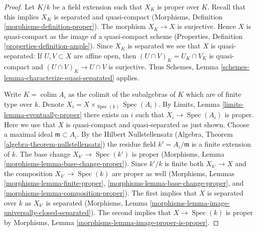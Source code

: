 \documentclass[10pt,a4paper]{amsart}
\theoremstyle{plain}
\theoremstyle{definition}
\theoremstyle{remark}
\numberwithin{equation}{subsection}
\def\colim{\mathop{\mathrm{colim}}\nolimits}
\def\Spec{\mathop{\mathrm{Spec}}}
\begin{document}
\begin{proof}
Let $K/k$ be a field extension such that $X_K$ is proper over $K$.
Recall that this implies $X_K$ is separated and quasi-compact
(Morphisms, Definition \ref{morphisms-definition-proper}).
The morphism $X_K \to X$ is surjective. Hence $X$ is quasi-compact
as the image of a quasi-compact scheme (Properties, Definition
\ref{properties-definition-ample}). Since $X_K$ is separated
we see that $X$ is quasi-separated: If $U, V \subset X$ are
affine open, then $(U \cap V)_K = U_K \cap V_K$ is quasi-compact
and $(U \cap V)_K \to U \cap V$ is surjective. Thus
Schemes, Lemma \ref{schemes-lemma-characterize-quasi-separated} applies.

\medskip\noindent
Write $K = \colim A_i$ as the colimit of the subalgebras of $K$
which are of finite type over $k$. Denote
$X_i = X \times_{\Spec(k)} \Spec(A_i)$.
By Limits, Lemma \ref{limits-lemma-eventually-proper}
there exists an $i$ such that $X_i \to \Spec(A_i)$ is proper.
Here we use that $X$ is quasi-compact and quasi-separated as
just shown. Choose a maximal ideal $\mathfrak m \subset A_i$.
By the Hilbert Nullstellensatz
(Algebra, Theorem \ref{algebra-theorem-nullstellensatz})
the residue field $k' = A_i/\mathfrak m$ is a finite
extension of $k$.  The base change $X_{k'} \to \Spec(k')$
is proper (Morphisms, Lemma \ref{morphisms-lemma-base-change-proper}).
Since $k'/k$ is finite both $X_{k'} \to X$ and the composition
$X_{k'} \to \Spec(k)$
are proper as well (Morphisms, Lemmas \ref{morphisms-lemma-finite-proper},
\ref{morphisms-lemma-base-change-proper}, and
\ref{morphisms-lemma-composition-proper}).
The first implies that $X$ is separated over $k$ as $X_{k'}$
is separated
(Morphisms, Lemma \ref{morphisms-lemma-image-universally-closed-separated}).
The second implies that $X \to \Spec(k)$ is proper
by Morphisms, Lemma \ref{morphisms-lemma-image-proper-is-proper}.
\end{proof}
\end{document}
